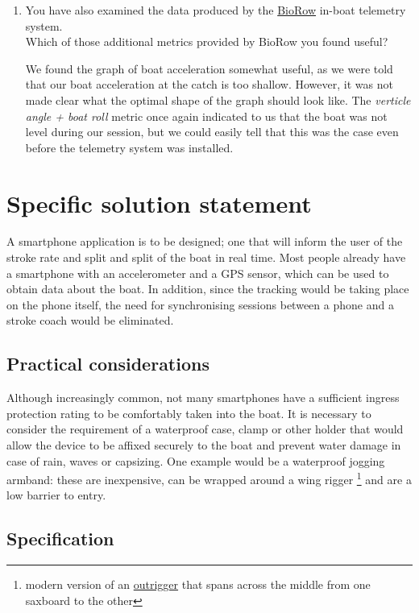 \documentclass[11pt,twoside,a4paper]{report}
\begin{document}
\begin{enumerate}
  \item You have also examined the data produced by the \href{http://biorow.com/}{BioRow} in-boat telemetry system. \\ Which of those additional metrics provided by BioRow you found useful?
  
  We found the graph of boat acceleration somewhat useful, as we were told that our boat acceleration at the catch is too shallow. However, it was not made clear what the optimal shape of the graph should look like. The \textit{verticle angle + boat roll} metric once again indicated to us that the boat was not level during our session, but we could easily tell that this was the case even before the telemetry system was installed.

\end{enumerate}

\section{Specific solution statement}

A smartphone application is to be designed; one that will inform the user of the stroke rate and split and split of the boat in real time. Most people already have a smartphone with an accelerometer and a GPS sensor, which can be used to obtain data about the boat. In addition, since the tracking would be taking place on the phone itself, the need for synchronising sessions between a phone and a stroke coach would be eliminated.


\subsection{Practical considerations}

Although increasingly common, not many smartphones have a sufficient ingress protection rating to be comfortably taken into the boat. 
It is necessary to consider the requirement of a waterproof case, clamp or other holder that would allow the device to be affixed securely to the boat and prevent water damage in case of rain, waves or capsizing. 
One example would be a waterproof jogging armband: these are inexpensive, can be wrapped around a wing rigger \footnote{modern version of an \href{https://en.wikipedia.org/wiki/Outrigger}{outrigger} that spans across the middle from one saxboard to the other} and are a low barrier to entry.

\subsection{Specification}
\end{document}
